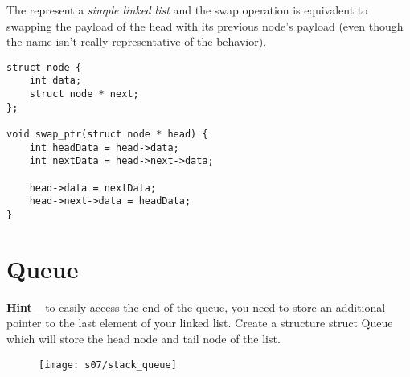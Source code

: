 The  represent a \emph{simple linked list} and the swap operation is equivalent to swapping the payload of the head with its previous node's payload (even though the name isn't really representative of the behavior).

\begin{lstlisting}
struct node {
    int data;
    struct node * next;
};

void swap_ptr(struct node * head) {
    int headData = head->data;
    int nextData = head->next->data;

    head->data = nextData;
    head->next->data = headData;
}
\end{lstlisting}

%
%
\section{Queue}


{\color{gray}\textbf{Hint} -- to easily access the end of the queue, you need to store
an additional pointer to the last element of your linked list. Create a
structure struct Queue which will store the head node and tail node of
the list.}


\begin{figure}[H]
    \center
    \texttt{[image: s07/stack\_queue]}
    \label{fig:stack_queue}
\end{figure}


